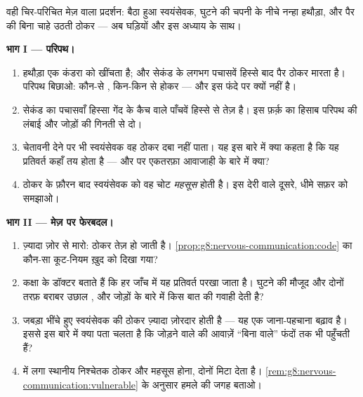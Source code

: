 \begin{problem}[{सप्ताहांत समस्या --- घुटने की उछाल, साज़ों के
साथ}]\label{pb:g8:nervous-communication:1}
वही चिर-परिचित मेज़ वाला प्रदर्शन: बैठा हुआ स्वयंसेवक, घुटने की चपनी के
नीचे नन्हा हथौड़ा, और पैर की बिना चाहे उठती ठोकर --- अब घड़ियों और इस
अध्याय के साथ।

\medskip\noindent\textbf{भाग I --- परिपथ।}
\begin{enumerate}
  \item हथौड़ा एक कंडरा को खींचता है; और सेकंड के लगभग पचासवें हिस्से
        बाद पैर ठोकर मारता है। परिपथ बिछाओ: कौन-से , किन-किन से
        होकर --- और इस फंदे पर  क्यों नहीं है।
  \item सेकंड का पचासवाँ हिस्सा गेंद के कैच वाले पाँचवें हिस्से से
        तेज़ है। इस फ़र्क़ का हिसाब परिपथ की लंबाई और जोड़ों की गिनती
        से दो।
  \item चेतावनी देने पर भी स्वयंसेवक वह ठोकर दबा नहीं पाता। यह इस बारे
        में क्या कहता है कि यह प्रतिवर्त कहाँ तय होता है --- और
         पर एकतरफ़ा आवाजाही के बारे में क्या?
  \item ठोकर के फ़ौरन बाद स्वयंसेवक को वह चोट \emph{महसूस} होती है।
        इस देरी वाले दूसरे, धीमे सफ़र को समझाओ।
\end{enumerate}

\medskip\noindent\textbf{भाग II --- मेज़ पर फेरबदल।}
\begin{enumerate}[resume]
  \item ज़्यादा ज़ोर से मारो: ठोकर तेज़ हो जाती है।
        \cref{prop:g8:nervous-communication:code} का कौन-सा कूट-नियम
        ख़ुद को दिखा गया?
  \item कक्षा के डॉक्टर बताते हैं कि हर जाँच में यह प्रतिवर्त परखा
        जाता है। घुटने की मौजूद और दोनों तरफ़ बराबर उछाल ,
         और जोड़ों के बारे में किस बात की गवाही देती है?
  \item जबड़ा भींचे हुए स्वयंसेवक की ठोकर ज़्यादा ज़ोरदार होती है ---
        यह एक जाना-पहचाना बढ़ाव है। इससे इस बारे में क्या पता चलता है
        कि जोड़ने वाले  की आवाज़ें ``बिना  वाले''
        फंदों तक भी पहुँचती हैं?
  \item {} में लगा स्थानीय निश्चेतक ठोकर और महसूस होना, दोनों मिटा
        देता है। \cref{rem:g8:nervous-communication:vulnerable} के
        अनुसार हमले की जगह बताओ।
\end{enumerate}


\end{problem}
